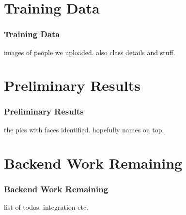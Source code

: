 \documentclass[aspectratio=169]{beamer}
\begin{document}
\section{Training Data}
\begin{frame}
	\centering
	\frametitle{Training Data}
	\begin{minipage}{0.95\textwidth}
		images of people we uploaded. also class details and stuff.
	\end{minipage}
\end{frame}
\section{Preliminary Results}
\begin{frame}
	\centering
	\frametitle{Preliminary Results}
	\begin{minipage}{0.95\textwidth}
		the pics with faces identified. hopefully names on top.
	\end{minipage}
\end{frame}
\section{Backend Work Remaining}
\begin{frame}
	\centering
	\frametitle{Backend Work Remaining}
	\begin{minipage}{0.95\textwidth}
		list of todos. integration etc.
	\end{minipage}
\end{frame}
\end{document}
